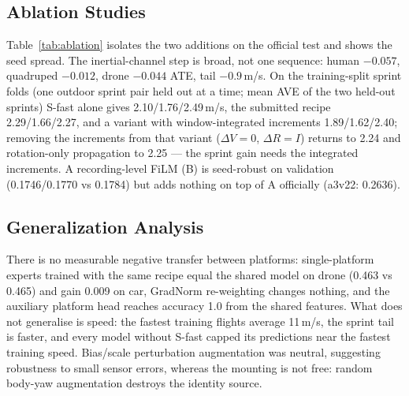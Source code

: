 \documentclass[letterpaper,10pt,conference]{ieeeconf}
\begin{document}
\subsection{Ablation Studies}
Table~\ref{tab:ablation} isolates the two additions on the official test and shows the seed spread.
The inertial-channel step is broad, not one sequence: human $-0.057$, quadruped $-0.012$,
drone $-0.044$ ATE, tail $-0.9$\,m/s. On the training-split sprint folds (one outdoor sprint pair
held out at a time; mean AVE of the two held-out sprints) S-fast alone gives 2.10/1.76/2.49\,m/s, the
submitted recipe 2.29/1.66/2.27, and a variant with window-integrated increments 1.89/1.62/2.40;
removing the increments from that variant ($\Delta V=0$, $\Delta R=I$) returns to 2.24 and rotation-only
propagation to 2.25 --- the sprint gain needs the integrated increments. A recording-level FiLM (B) is
seed-robust on validation (0.1746/0.1770 vs 0.1784) but adds nothing on top of A officially
(a3v22: 0.2636).

\begin{table}[htbp]
\centering\scriptsize
\caption{Ablation on the official full test (train+val fits, last epoch). ATE$_{20}$ per platform;
drone as ATE$_{20}$/AVE; ``tail'' is the summed AVE (m/s) of \#29, \#56, \#37, \#38.}
\setlength{\tabcolsep}{2.5pt}
\label{tab:ablation}
\end{table}

\subsection{Generalization Analysis}
There is no measurable negative transfer between platforms: single-platform experts trained with the
same recipe equal the shared model on drone (0.463 vs 0.465) and gain 0.009 on car, GradNorm
re-weighting changes nothing, and the auxiliary platform head reaches accuracy 1.0 from the shared
features. What does not generalise is speed: the fastest training flights average 11\,m/s, the
sprint tail is faster, and every model without S-fast capped its predictions near the fastest
training speed. Bias/scale perturbation augmentation was neutral, suggesting robustness to small sensor
errors, whereas the mounting is not free: random body-yaw augmentation destroys the identity source.
\end{document}
